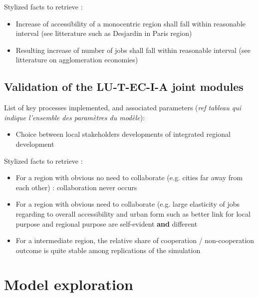 Stylized facts to retrieve : 
\begin{itemize}
	\item Increase of accessibility of a monocentric region shall fall within reasonable interval (see litterature such as Desjardin in Paris region) 
	\item Resulting increase of number of jobs shall fall within reasonable interval (see litterature on agglomeration economies)
\end{itemize}





\subsection{Validation of the LU-T-EC-I-A joint modules}

List of key processes implemented, and associated parameters (\textit{ref tableau qui indique l'ensemble des paramètres du modèle}):
\begin{itemize}
	\item Choice between local stakeholders developments of integrated regional development
	
\end{itemize}


Stylized facts to retrieve : 
\begin{itemize}
	\item For a region with obvious no need to collaborate (e.g. cities far away from each other) : collaboration never occurs
	\item For a region with obvious need to collaborate (e.g. large elasticity of jobs regarding to overall accessibility and urban form such as better link for local purpose and regional purpose are self-evident \textbf{and} different
	\item For a intermediate region, the relative share of cooperation / non-cooperation outcome is quite stable among replications of the simulation
\end{itemize}



\section{Model exploration}













